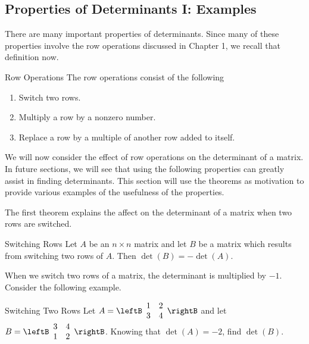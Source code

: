 \subsection{Properties of Determinants I: Examples}

There are many important properties of determinants. Since many of these properties involve
the row operations discussed in Chapter 1, we recall that definition now. 

\begin{definition}{Row Operations}\label{def:operations}
The row operations consist of the following

\begin{enumerate}
\item Switch two rows.

\item Multiply a row by a nonzero number.

\item Replace a row by a multiple of another row added to itself.
\end{enumerate}
\end{definition}

We will now consider the effect of row operations on the determinant of a matrix. In future sections, we will see that using the following properties can 
greatly assist in finding determinants. This section will use the theorems as motivation to provide various examples of the usefulness of the properties. 

The first theorem explains the affect on the determinant of a matrix when two rows are switched. 

\begin{theorem}{Switching Rows}\label{thm:switchingrows}
Let $A$ be an $n\times n$ matrix and let $B$ be a matrix
which results from switching two rows of $A.$ Then $\det \left( B\right)
= - \det \left( A\right) .$ 
\end{theorem}

When we switch two rows of a matrix, the determinant is multiplied by $-1$. Consider the following example.

\begin{example}{Switching Two Rows}\label{exa:switchingrows}
Let $A=\leftB
\begin{array}{rr}
1 & 2 \\
3 & 4
\end{array}
\rightB $ and let $B=\leftB
\begin{array}{rr}
3 & 4 \\
1 & 2
\end{array}
\rightB $. 
Knowing that $\det \left( A \right) =-2$, find $\det \left( B \right) $.
\end{example}

